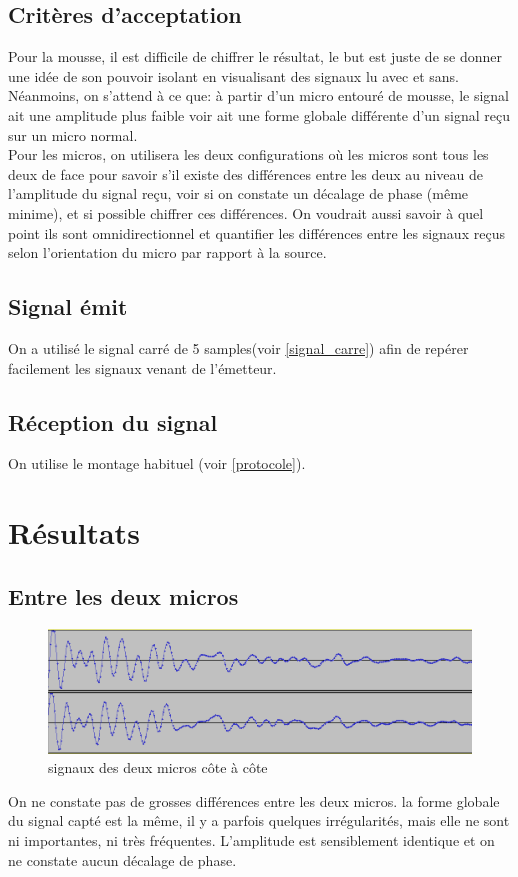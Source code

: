 \documentclass[12pt,a4paper]{report}
\begin{document}
\subsection{Critères d'acceptation}
Pour la mousse, il est difficile de chiffrer le résultat, le but est juste de se donner une idée de son pouvoir isolant en visualisant des signaux lu avec et sans. Néanmoins, on s'attend à ce que: à partir d'un micro entouré de mousse, le signal ait une amplitude plus faible voir ait une forme globale différente d'un signal reçu sur un micro normal.\\
Pour les micros, on utilisera les deux configurations où les micros sont tous les deux de face pour savoir s'il existe des différences entre les deux au niveau de l'amplitude du signal reçu, voir si on constate un décalage de phase (même minime), et si possible chiffrer ces différences. On voudrait aussi savoir à quel point ils sont omnidirectionnel et quantifier les différences entre les signaux reçus selon l'orientation du micro par rapport à la source.


\subsection{Signal émit}
On a utilisé le signal carré de 5 samples(voir \ref{signal_carre}) afin de repérer facilement les signaux venant de l'émetteur.

\subsection{Réception du signal}
On utilise le montage habituel (voir \ref{protocole}).

\section{Résultats}

\subsection{Entre les deux micros}

\begin{figure}[H]
\includegraphics[width=\textwidth]{img/micros_face.png}
\caption{signaux des deux micros côte à côte}
\end{figure}
On ne constate pas de grosses différences entre les deux micros. la forme globale du signal capté est la même, il y a parfois quelques irrégularités, mais elle ne sont ni importantes, ni très fréquentes. L'amplitude est sensiblement identique et on ne constate aucun décalage de phase.
\end{document}
